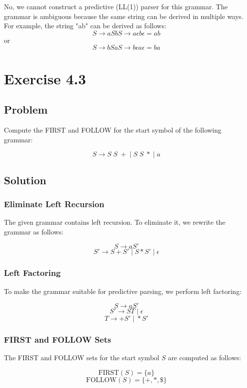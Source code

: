 No, we cannot construct a predictive (LL(1)) parser for this grammar. The grammar is ambiguous because the same string can be derived in multiple ways. For example, the string "ab" can be derived as follows:
\[S \to a S b S \to a \epsilon b \epsilon = ab
\]
or
\[S \to b S a S \to b \epsilon a \epsilon = ba
\]

\chapter{Exercise 4.3}

\section{Problem}

Compute the FIRST and FOLLOW for the start symbol of the following grammar:

\[
S \to S\;S\;+ \;|\; S\;S\;* \;|\; a
\]

\section{Solution}

\subsection{Eliminate Left Recursion}

The given grammar contains left recursion. To eliminate it, we rewrite the grammar as follows:

\[
S \to aS' 
\]
\[
S' \to S+S' \;|\; S*S' \;|\; \epsilon
\]

\subsection{Left Factoring}

To make the grammar suitable for predictive parsing, we perform left factoring:

\[
S \to aS' 
\]
\[
S' \to S T \;|\; \epsilon
\]
\[
T \to +S' \;|\; *S'
\]

\subsection{FIRST and FOLLOW Sets}

The FIRST and FOLLOW sets for the start symbol $S$ are computed as follows:

\[
\text{FIRST}(S) = \{a\}
\]
\[
\text{FOLLOW}(S) = \{+, *, \$\}
\]
